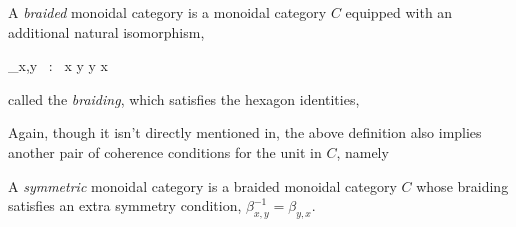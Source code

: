 \begin{defn} \label{bdmoncat} A \emph{braided} monoidal category is a monoidal category $C$ equipped with an additional natural isomorphism,
\begin{eq*} \beta_{x,y} \, : \, x \otimes y \longrightarrow y \otimes x \end{eq*}
called the \emph{braiding}, which satisfies the hexagon identities,
\begin{eq*}  \end{eq*}
\begin{eq*}  \end{eq*}
\end{defn}

Again, though it isn't directly mentioned in, the above definition also implies another pair of coherence conditions for the unit in $C$, namely
\begin{eq*}  \end{eq*}

\begin{defn} \label{symmoncat} A \emph{symmetric} monoidal category is a braided monoidal category $C$ whose braiding satisfies an extra symmetry condition, $\beta_{x, y}^{-1} = \beta_{y,x}$.
\end{defn}

